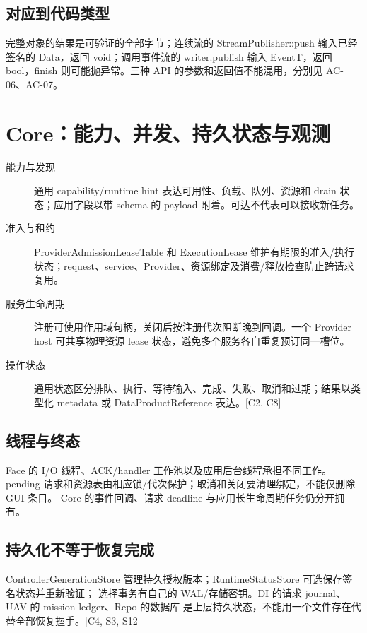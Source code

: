 

\subsection{对应到代码类型}
完整对象的结果是可验证的全部字节；连续流的 StreamPublisher::push 输入已经签名的 Data，返回 void；调用事件流的 writer.publish 输入 EventT，返回 bool，finish 则可能抛异常。三种 API 的参数和返回值不能混用，分别见 AC-06、AC-07。

\newpage

\section{Core：能力、并发、持久状态与观测}
\begin{description}
\item[能力与发现] 通用 capability/runtime hint 表达可用性、负载、队列、资源和 drain 状态；应用字段以带 schema 的 payload 附着。可达不代表可以接收新任务。
\item[准入与租约] ProviderAdmissionLeaseTable 和 ExecutionLease 维护有期限的准入/执行状态；request、service、Provider、资源绑定及消费/释放检查防止跨请求复用。
\item[服务生命周期] 注册可使用作用域句柄，关闭后按注册代次阻断晚到回调。一个 Provider host 可共享物理资源 lease 状态，避免多个服务各自重复预订同一槽位。
\item[操作状态] 通用状态区分排队、执行、等待输入、完成、失败、取消和过期；结果以类型化 metadata 或 DataProductReference 表达。[C2, C8]
\end{description}

\subsection{线程与终态}
Face 的 I/O 线程、ACK/handler 工作池以及应用后台线程承担不同工作。
pending 请求和资源表由相应锁/代次保护；取消和关闭要清理绑定，不能仅删除 GUI 条目。
Core 的事件回调、请求 deadline 与应用长生命周期任务仍分开拥有。

\subsection{持久化不等于恢复完成}
ControllerGenerationStore 管理持久授权版本；RuntimeStatusStore 可选保存签名状态并重新验证；
选择事务有自己的 WAL/存储密钥。DI 的请求 journal、UAV 的 mission ledger、Repo 的数据库
是上层持久状态，不能用一个文件存在代替全部恢复握手。[C4, S3, S12]

